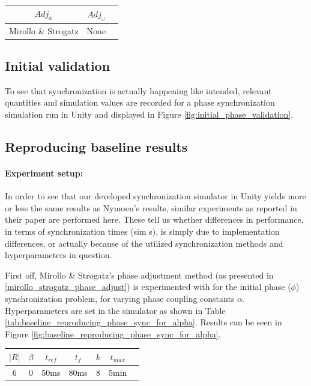 \begin{center}
\begin{tabular}{ |c|c|c| } 
\hline
$Adj_\phi$ & $Adj_\omega$ \\
\hline
Mirollo \& Strogatz & None  \\
\hline
\end{tabular}
\label{tab:phase_sync}
\end{center}

	\subsection{Initial validation}
	
	To see that synchronization is actually happening like intended, relevant quantities and simulation values are recorded for a phase synchronization simulation run in Unity and displayed in Figure \ref{fig:initial_phase_validation}.
	
	
	\subsection{Reproducing baseline results}
	
		\paragraph{Experiment setup:\nl}
		
		In order to see that our developed synchronization simulator in Unity yields more or less the same results as Nymoen's results, similar experiments as reported in their paper are performed here. These tell us whether differences in performance, in terms of synchronization times (sim s), is simply due to implementation differences, or actually because of the utilized synchronization methods and hyperparameters in question. 
		
		First off, Mirollo \& Strogatz's phase adjustment method (as presented in \ref{mirollo_strogatz_phase_adjust}) is experimented with for the initial phase ($\phi$) synchronization problem, for varying phase coupling constants $\alpha$. Hyperparameters are set in the simulator as shown in Table \ref{tab:baseline_reproducing_phase_sync_for_alpha}. Results can be seen in Figure \ref{fig:baseline_reproducing_phase_sync_for_alpha}.
		
		\begin{center}
		\begin{tabular}{ |c|c|c|c|c|c|c| } 
		\hline
		$|R|$ & $\beta$ & $t_{ref}$ & $t_f$ & $k$ & $t_{max}$ \\
		\hline
		6 & 0 & 50ms & 80ms & 8 & 5min \\
		\hline
		\end{tabular}
		\label{tab:baseline_reproducing_phase_sync_for_alpha}
		\end{center}
		

